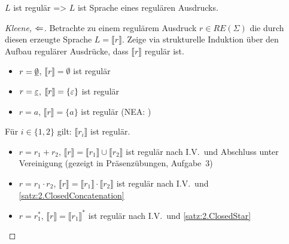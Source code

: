     
\begin{Satz}[Kleene]\label{sat:2.kleene}
$L$ ist regulär \<=> $L$ ist Sprache eines regulären Ausdrucks.
\end{Satz}


\begin{proof}[Kleene, $\<=$]
Betrachte zu einem regulärem Ausdruck $r\in RE(\Sigma)$ die durch diesen erzeugte Sprache $L=\llbracket r \rrbracket$. 
Zeige via strukturelle Induktion über den Aufbau regulärer Ausdrücke, dass $ \llbracket r \rrbracket$ regulär ist.
    	\begin{description}[font=\normalfont]
      \item[I.A.:] \hfill
        \vspace{-1.45\baselineskip}
        \begin{itemize}
        \item $r = \underline{\smash{\emptyset}}$, $\llbracket r \rrbracket = \emptyset$ ist regulär
        \item $r = \underline{\smash{\varepsilon}}$, $[\![ r ]\!] = \{ \varepsilon \}$ ist regulär
        \item $r = a$, $\llbracket r \rrbracket = \{ a \}$ ist regulär
          (\acs{NEA}: 
    			) 
        \end{itemize}
        \item[I.V.:] Für $i \in \{1, 2\}$ gilt: $\llbracket r_i \rrbracket$ ist regulär.
    		\item[I.S.:] \hfill
          \vspace{-1.45\baselineskip}
          \begin{itemize}
          \item $r = r_1 + r_2$, $\llbracket r \rrbracket = \llbracket r_1 \rrbracket \cup \llbracket r_2 \rrbracket$ ist regulär nach I.V.\ und Abschluss unter Vereinigung (gezeigt in Präsenzübungen, Aufgabe~3)
          \item $r = r_1 \cdot r_2$, $\llbracket r \rrbracket = \llbracket r_1 \rrbracket \cdot \llbracket r_2 \rrbracket$ ist regulär nach I.V.\ und \autoref{satz:2.ClosedConcatenation}
          \item $r = r_1^*$, $\llbracket r \rrbracket = \llbracket r_1 \rrbracket^*$ ist regulär nach I.V.\ und \autoref{satz:2.ClosedStar}
          \qedhere
          \end{itemize}
		\end{description}
\end{proof}


